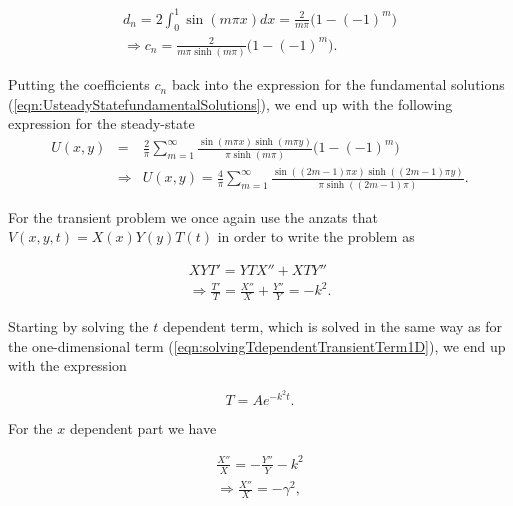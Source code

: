 \documentclass{article}
\begin{document}
\begin{subequations}
	\begin{eqnarray}
	d_n = 2\int_0^1 \sin(m\pi x) dx = \frac{2}{m\pi}\Big(1-(-1)^m\Big)\\
	\Rightarrow c_n = \frac{2}{m\pi \sinh(m\pi)}\Big(1-(-1)^m\Big).
	\end{eqnarray}
\end{subequations}

Putting the coefficients $c_n$ back into the expression for the fundamental solutions (\ref{eqn:UsteadyStatefundamentalSolutions}), we end up with the following expression for the steady-state
\begin{subequations}
	\begin{eqnarray}
	U(x,y) &=& \frac{2}{\pi} \sum_{m=1}^{\infty} \frac{\sin(m\pi x)\sinh(m\pi y)}{\pi \sinh(m\pi)}\Big(1-(-1)^m \Big)\\ 
	&\Rightarrow & U(x,y) = \frac{4}{\pi} \sum_{m=1}^{\infty} \frac{\sin((2m-1)\pi x)\sinh((2m-1)\pi y)}{\pi \sinh((2m-1)\pi)}.
	\end{eqnarray}
\end{subequations}

For the transient problem we once again use the anzats that $V(x,y,t) = X(x)Y(y)T(t)$ in order to write the problem as

\begin{subequations}
	\begin{eqnarray}
	XYT' = YTX'' + XTY'' \\
	\Rightarrow \frac{T'}{T} = \frac{X''}{X} + \frac{Y''}{Y} = -k^2.
	\end{eqnarray}
\end{subequations}

Starting by solving the $t$ dependent term, which is solved in the same way as for the one-dimensional term (\ref{eqn:solvingTdependentTransientTerm1D}), we end up with the expression

\begin{equation}
T=Ae^{-k^2t}.
\label{eqn:2DtransientTdependentGeneralTerm}
\end{equation}

For the $x$ dependent part we have 

\begin{subequations}
	\begin{eqnarray}\label{eq:xOde}
	\frac{X''}{X} = -\frac{Y''}{Y} - k^2\\
	\Rightarrow \frac{X''}{X} = -\gamma^2,
	\end{eqnarray}
\end{subequations}
\end{document}
